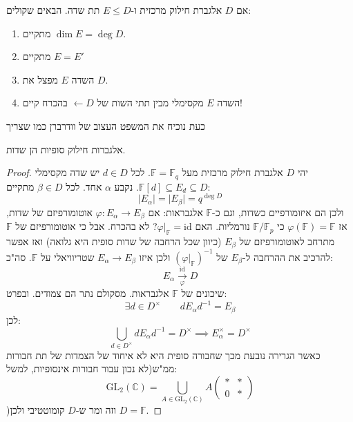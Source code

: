 \documentclass{tstextbook}
\begin{document}
\begin{proposition}
אם \(D\) אלגברת חילוק מרכזית ו-\(E\leq D\) תת שדה. הבאים שקולים:

  \begin{enumerate}
    \item מתקיים \(\dim E = \deg D\). 


    \item מתקיים \(E=E'\)


    \item השדה \(E\) מפצל את \(D\). 


    \item השדה \(E\) מקסימלי מבין תתי השות של \(D\)\(\leftarrow\) בהכרח קיים! 


  \end{enumerate}
\end{proposition}
כעת נוכיח את המשפט העצוב של וודרברן כמו שצריך

\begin{corollary}
אלגברות חילוק סופיות הן שדות.

\end{corollary}
\begin{proof}
יהי \(D\) אלגברת חילוק מרכזית מעל \(\mathbb{F}=\mathbb{F}_{q}\). לכל \(d \in D\) יש שדה מקסימלי \(\mathbb{F}[d]\subseteq E_{d}\subseteq D\). נקבע \(\alpha\) אחד. לכל \(\beta \in D\) מתקיים:
$$\lvert E_{\alpha} \rvert =\lvert E_{\beta} \rvert=q^{\deg D}$$
ולכן הם איזומורפיים כשדות, וגם כ-\(\mathbb{F}\) אלגבראות: אם \(\varphi:E_{\alpha}\to E_{\beta}\) אוטומורפיזם של שדות, אז \(\varphi(\mathbb{F})=\mathbb{F}\) כי \(\mathbb{F} / \mathbb{F}_{p}\) נורמליות. האם \(\varphi|_{\mathbb{F}}=\mathrm{id}\)? לא בהכרח. אבל כי אוטומורפיזם של \(\mathbb{F}\) מתרחב לאוטומורפיזם של \(E_{\beta}\) (כיוון שכל הרחבה של שדות סופית היא גלואה) ואז אפשר להרכיב את ההרחבה ל-\(E_{\beta}\) של \((\varphi|_{\mathbb{F}})^{-1}\) ולכן איזו \(E_{\alpha}\to E_{\beta}\) שטריוויאלי על \(\mathbb{F}\). סה"כ:
$$E_{\alpha}\xrightarrow[\varphi]{\text{id}}D$$
שיכונים של \(\mathbb{F}\) אלגבראות. מסקולם נתר הם צמודים. ובפרט:
$$\exists d \in D^{\times}\qquad dE_{\alpha}d ^{-1}  = E_{\beta}$$
לכן:
$$\bigcup_{d \in D^{\times}}d E_{\alpha }d ^{-1} = D^{\times}\implies E_{\alpha}^{\times}= D^{\times}$$
כאשר הגרירה נובעת מכך שחבורה סופית היא לא איחוד של הצמדות של תת חבורות ממ"ש(לא נכון עבור חבורות אינסופיות, למשל:
$$\text{GL}_{2}(\mathbb{C})=\bigcup_{A \in \text{GL}_{2}(\mathbb{C})}A\begin{pmatrix}*  &  * \\0 & *
\end{pmatrix}$$
)וזה ומר ש-\(D\) קומוטטיבי ולכן \(D=\mathbb{F}\).

\end{proof}
\end{document}
